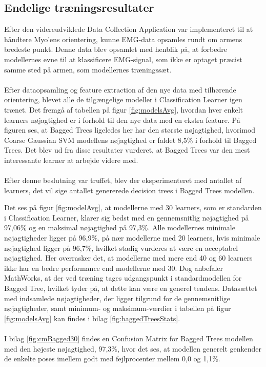  \subsection{Endelige træningsresultater}
 Efter den videreudviklede Data Collection Application var implementeret til at håndtere Myo'ens orientering, kunne EMG-data opsamles rundt om armens bredeste punkt. Denne data blev opsamlet med henblik på, at forbedre modellernes evne til at klassificere EMG-signal, som ikke er optaget præcist samme sted på armen, som modellernes træningssæt.\\\\
 Efter dataopsamling og feature extraction af den nye data med tilhørende orientering, blevet alle de tilgængelige modeller i Classification Learner igen trænet. Det fremgå af tabellen på figur \ref{fig:modelsAvg}, hvordan hver enkelt learners nøjagtighed er i forhold til den nye data med en ekstra feature. På figuren ses, at Bagged Trees ligeledes her har den største nøjagtighed, hvorimod Coarse Gaussian SVM modellens nøjagtighed er faldet 8,5\% i forhold til Bagged Trees. Det blev ud fra disse resultater vurderet, at Bagged Trees var den mest interessante learner at arbejde videre med.
 \\\\ 
Efter denne beslutning var truffet, blev der eksperimenteret med antallet af learners, det vil sige antallet genererede decision trees i Bagged Trees modellen.

Det ses på figur \ref{fig:modelAvg}, at modellerne med 30 learners, som er standarden i Classification Learner, klarer sig bedst med en gennemsnitlig nøjagtighed på 97,06\% og en maksimal nøjagtighed på 97,3\%. Alle modellernes minimale nøjagtigheder ligger på 96,9\%, på nær modellerne med 20 learners, hvis minimale nøjagtighed ligger på 96,7\%, hvilket stadig vurderes at være en acceptabel nøjagtighed. Her overrasker det, at modellerne med mere end 40 og 60 learners ikke har en bedre performance end modellerne med 30. Dog anbefaler MathWorks, at der ved træning tages udgangspunkt i standardmodellen for 
Bagged Tree\citep{matFastModels}, hvilket tyder på, at dette kan være en generel tendens. Datasættet med indsamlede nøjagtigheder, der ligger tilgrund for de gennemsnitlige nøjagtigheder, samt minimum- og maksimum-værdier i tabellen på figur \ref{fig:modelsAvg} kan findes i bilag \ref{fig:baggedTreesStats}.\\\\
I bilag \ref{fig:cmBagged30} findes en Confusion Matrix for Bagged Trees modellen med den højeste nøjagtighed, 97,3\%, hvor det ses, at modellen generelt genkender de enkelte poses imellem godt med fejlprocenter mellem 0,0 og 1,1\%. 

